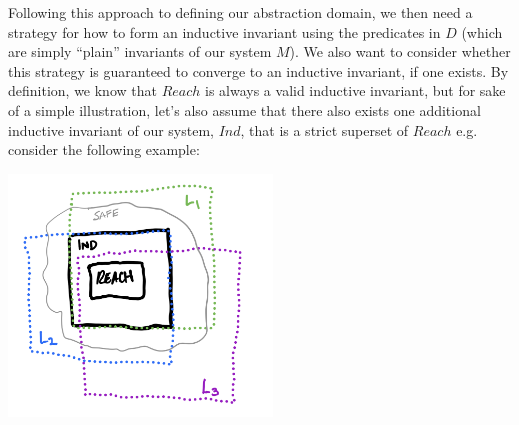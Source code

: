 \documentclass[10pt]{article}
\begin{document}
Following this approach to defining our abstraction domain, we then need a strategy for how to form an inductive invariant using the predicates in $D$ (which are simply ``plain'' invariants of our system $M$). We also want to consider whether this strategy is guaranteed to converge to an inductive invariant, if one exists. By definition, we know that $Reach$ is always a valid inductive invariant, but for sake of a simple illustration, let's also assume that there also exists one additional inductive invariant of our system, $Ind$, that is a strict superset of $Reach$ e.g. consider the following example:
\begin{center}
    \includegraphics[width=70mm]{invs1.png}  
\end{center}
\end{document}
